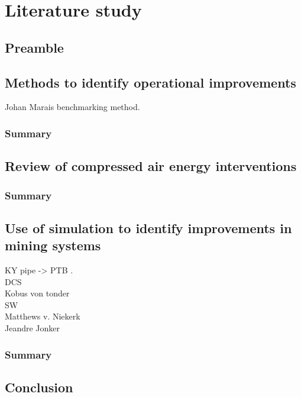 \chapter{Literature study}
\section{Preamble}
\section{Methods to identify operational improvements}
Johan Marais benchmarking method.
	\subsection{Summary}
\section{Review of compressed air energy interventions}
	\subsection{Summary}
\section{Use of simulation to identify improvements in mining systems}
KY pipe -> PTB .\\
DCS\\
Kobus von tonder\\
SW\\
Matthews v. Niekerk\\
Jeandre Jonker
	\subsection{Summary}
\section{Conclusion}